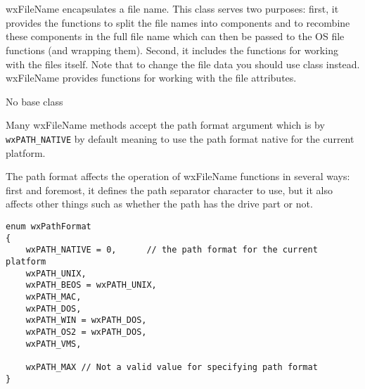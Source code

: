 
\section{}\label{wxfilename}

wxFileName encapsulates a file name. This class serves two purposes: first, it
provides the functions to split the file names into components and to recombine
these components in the full file name which can then be passed to the OS file
functions (and  wrapping them).
Second, it includes the functions for working with the files itself. Note that
to change the file data you should use  class instead.
wxFileName provides functions for working with the file attributes.


No base class


Many wxFileName methods accept the path format argument which is by\rtfsp
{\tt wxPATH\_NATIVE} by default meaning to use the path format native for the
current platform.

The path format affects the operation of wxFileName functions in several ways:
first and foremost, it defines the path separator character to use, but it also
affects other things such as whether the path has the drive part or not.

\begin{verbatim}
enum wxPathFormat
{
    wxPATH_NATIVE = 0,      // the path format for the current platform
    wxPATH_UNIX,
    wxPATH_BEOS = wxPATH_UNIX,
    wxPATH_MAC,
    wxPATH_DOS,
    wxPATH_WIN = wxPATH_DOS,
    wxPATH_OS2 = wxPATH_DOS,
    wxPATH_VMS,

    wxPATH_MAX // Not a valid value for specifying path format
}
\end{verbatim}




